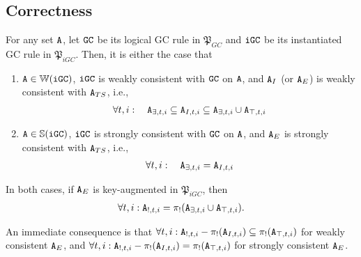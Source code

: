 \subsection{Correctness}
\begin{thm}
\label{thm:instantiated_correctness}
For any set $\tt{A}$, let $\tt{GC}$ be its logical GC rule in $\mathfrak{P}_{GC}$ and $\tt{iGC}$ be its instantiated GC rule in $\mathfrak{P}_{iGC}$.
Then, it is either the case that
\begin{enumerate}
\item $\tt{A} \in \mathbb{W}(\tt{iGC})$, $\tt{iGC}$ is weakly consistent with $\tt{GC}$ on $\tt{A}$, and $\tt{A}_I$ (or $\tt{A}_E$) is weakly consistent with $\tt{A}_{TS}$, i.e.,
\begin{align}
\forall t, i: \quad \tt{A}_{\exists,t,i} \subseteq \tt{A}_{I,t,i} \subseteq \tt{A}_{\exists,t,i} \cup \tt{A}_{\top,t,i} \label{eq:thm_instantiated_correctness_set}
\end{align}
\item $\tt{A} \in \mathbb{S}(\tt{iGC})$, $\tt{iGC}$ is strongly consistent with $\tt{GC}$ on $\tt{A}$, and $\tt{A}_E$ is strongly consistent with $\tt{A}_{TS}$, i.e.,
\begin{align}
\forall t, i: \quad \tt{A}_{\exists,t,i} = \tt{A}_{I,t,i} \label{eq:thm_instantiated_correctness_set_strong}
\end{align}
\end{enumerate}
In both cases, if $\tt{A}_E$ is key-augmented in $\mathfrak{P}_{iGC}$, then
\begin{align}
\forall t, i : \tt{A}_{!,t,i} = \pi_!(\tt{A}_{\exists,t,i} \cup \tt{A}_{\top,t,i}) \label{eq:thm_instantiated_correctness_key}.
\end{align}
\end{thm}
\begin{rmk}
An immediate consequence is that $\forall t, i: \tt{A}_{!,t,i} - \pi_!(\tt{A}_{I,t,i}) \subseteq \pi_!(\tt{A}_{\top,t,i})$ for weakly consistent $\tt{A}_E$, and $\forall t, i: \tt{A}_{!,t,i} - \pi_!(\tt{A}_{I,t,i}) = \pi_!(\tt{A}_{\top,t,i})$ for strongly consistent $\tt{A}_E$.
\end{rmk}
